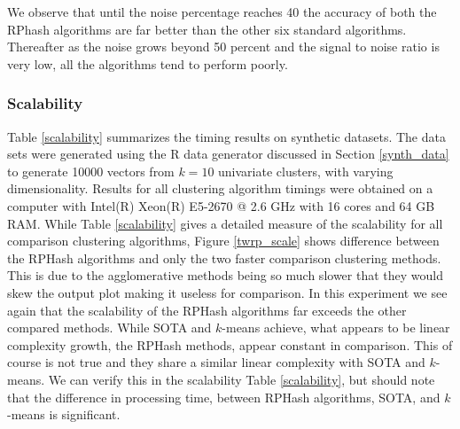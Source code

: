 We observe that until the noise percentage reaches 40 the accuracy of both the \textsf{RPhash} algorithms
are far better than the other six standard algorithms. Thereafter as the noise grows beyond 50
percent and the signal to noise ratio is very low, all the algorithms tend to perform poorly.

\subsubsection{Scalability}

Table \ref{scalability} summarizes the timing results on synthetic datasets.  The data sets were
generated using the R data generator discussed in Section \ref{synth_data} to generate 10000 vectors from $k=10$
univariate clusters, with varying dimensionality.  Results for all clustering algorithm timings were
obtained on a computer with Intel(R) Xeon(R) E5-2670 @ 2.6 GHz with 16 cores and 64 GB RAM.  While
Table \ref{scalability} gives a detailed measure of the scalability for all comparison clustering
algorithms, Figure \ref{twrp_scale} shows difference between the \textsf{RPHash} algorithms and only the two
faster comparison clustering methods.  This is due to the agglomerative methods being so much slower
that they would skew the output plot making it useless for comparison.  In this experiment we see again
that the scalability of the \textsf{RPHash} algorithms far exceeds the other compared methods.  While SOTA and $k$-means
achieve, what appears to be linear complexity growth, the \textsf{RPHash} methods, appear constant in comparison.  This 
of course is not true and they share a similar linear complexity with  SOTA and $k$-means. We 
can verify this in the scalability Table \ref{scalability}, but should note that the difference in processing time, 
between \textsf{RPHash} algorithms, SOTA, and $k$-means is significant.

